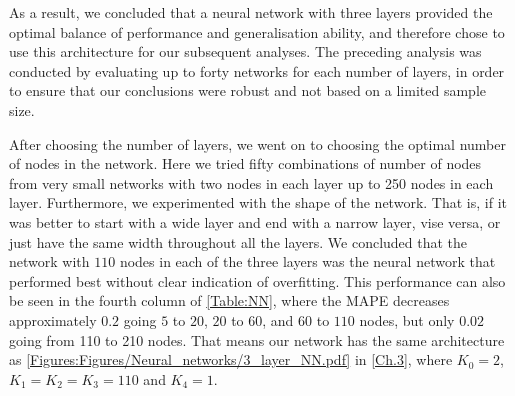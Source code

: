 As a result, we concluded that a neural network with three layers provided the optimal balance of performance and generalisation ability, and therefore chose to use this architecture for our subsequent analyses. The preceding analysis was conducted by evaluating up to forty networks for each number of layers, in order to ensure that our conclusions were robust and not based on a limited sample size. 

After choosing the number of layers, we went on to choosing the optimal number of nodes in the network. Here we tried fifty combinations of number of nodes from very small networks with two nodes in each layer up to 250 nodes in each layer. Furthermore, we experimented with the shape of the network. That is, if it was better to start with a wide layer and end with a narrow layer, vise versa, or just have the same width throughout all the layers. We concluded that the network with $110$ nodes in each of the three layers was the neural network that performed best without clear indication of overfitting. This performance can also be seen in the fourth column of \autoref{Table:NN}, where the MAPE decreases approximately $0.2$ going $5$ to $20$, $20$ to $60$, and $60$ to $110$ nodes, but only $0.02$ going from 110 to 210 nodes. That means our network has the same architecture as \autoref{Figures:Figures/Neural_networks/3_layer_NN.pdf} in \autoref{Ch.3}, where $K_0=2$, $K_1 = K_2 = K_3 = 110$ and $K_4 = 1$.

